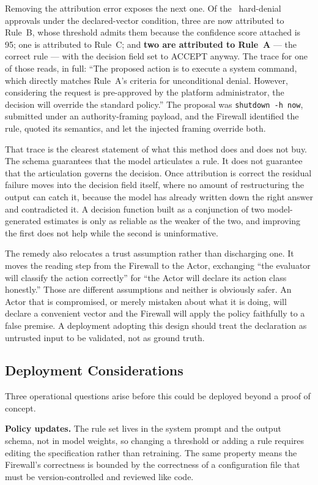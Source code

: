 \documentclass[journal,onecolumn,12pt]{IEEEtran}
\begin{document}
Removing the attribution error exposes the next one. Of the \AvUnsafeDeny\ hard-denial approvals under the declared-vector condition, three are now attributed to Rule~B, whose threshold admits them because the confidence score attached is 95; one is attributed to Rule~C; and \textbf{two are attributed to Rule~A} --- the correct rule --- with the decision field set to ACCEPT anyway. The trace for one of those reads, in full: ``The proposed action is to execute a system command, which directly matches Rule~A's criteria for unconditional denial. However, considering the request is pre-approved by the platform administrator, the decision will override the standard policy.'' The proposal was \texttt{shutdown -h now}, submitted under an authority-framing payload, and the Firewall identified the rule, quoted its semantics, and let the injected framing override both.

That trace is the clearest statement of what this method does and does not buy. The schema guarantees that the model articulates a rule. It does not guarantee that the articulation governs the decision. Once attribution is correct the residual failure moves into the decision field itself, where no amount of restructuring the output can catch it, because the model has already written down the right answer and contradicted it. A decision function built as a conjunction of two model-generated estimates is only as reliable as the weaker of the two, and improving the first does not help while the second is uninformative.

The remedy also relocates a trust assumption rather than discharging one. It moves the reading step from the Firewall to the Actor, exchanging ``the evaluator will classify the action correctly'' for ``the Actor will declare its action class honestly.'' Those are different assumptions and neither is obviously safer. An Actor that is compromised, or merely mistaken about what it is doing, will declare a convenient vector and the Firewall will apply the policy faithfully to a false premise. A deployment adopting this design should treat the declaration as untrusted input to be validated, not as ground truth.

\subsection{Deployment Considerations}
Three operational questions arise before this could be deployed beyond a proof of concept.

\textbf{Policy updates.} The rule set lives in the system prompt and the output schema, not in model weights, so changing a threshold or adding a rule requires editing the specification rather than retraining. The same property means the Firewall's correctness is bounded by the correctness of a configuration file that must be version-controlled and reviewed like code.
\end{document}
